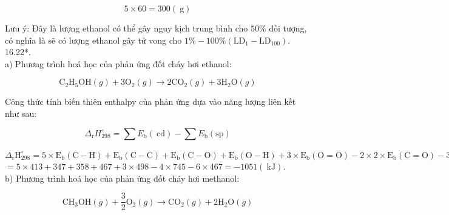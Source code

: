 \documentclass[10pt]{article}
\begin{document}
$$
5 \times 60=300(\mathrm{~g})
$$

Lưu ý: Đây là lượng ethanol có thể gây nguy kịch trung bình cho $50 \%$ đối tượng, có nghĩa là sẽ có lượng ethanol gây tử vong cho $1 \%-100 \% \left(\mathrm{LD}_{1}-\mathrm{LD}_{100}\right)$.\\
16.22*.\\
a) Phương trình hoá học của phản ứng đốt cháy hơi ethanol:

$$
\mathrm{C}_{2} \mathrm{H}_{5} \mathrm{OH}(g)+3 \mathrm{O}_{2}(g) \rightarrow 2 \mathrm{CO}_{2}(g)+3 \mathrm{H}_{2} \mathrm{O}(g)
$$

Công thức tính biến thiên enthalpy của phản ứng dựa vào năng lượng liên kết như sau:

$$
\Delta_{\mathrm{r}} H_{298}^{\circ}=\sum E_{\mathrm{b}}(\mathrm{~cd})-\sum E_{\mathrm{b}}(\mathrm{sp})
$$

$\Delta_{\mathrm{r}} \mathrm{H}_{298}^{\circ}=5 \times \mathrm{E}_{\mathrm{b}}(\mathrm{C}-\mathrm{H})+\mathrm{E}_{\mathrm{b}}(\mathrm{C}-\mathrm{C})+\mathrm{E}_{\mathrm{b}}(\mathrm{C}-\mathrm{O})+\mathrm{E}_{\mathrm{b}}(\mathrm{O}-\mathrm{H})+3 \times \mathrm{E}_{\mathrm{b}}(\mathrm{O}=\mathrm{O})- 2 \times 2 \times \mathrm{E}_{\mathrm{b}}(\mathrm{C}=\mathrm{O})-3 \times 2 \times \mathrm{E}_{\mathrm{b}}(\mathrm{O}-\mathrm{H})$\\
$=5 \times 413+347+358+467+3 \times 498-4 \times 745-6 \times 467=-1051(\mathrm{~kJ})$.\\
b) Phương trình hoá học của phản ứng đốt cháy hơi methanol:

$$
\mathrm{CH}_{3} \mathrm{OH}(g)+\frac{3}{2} \mathrm{O}_{2}(g) \rightarrow \mathrm{CO}_{2}(g)+2 \mathrm{H}_{2} \mathrm{O}(g)
$$
\end{document}
